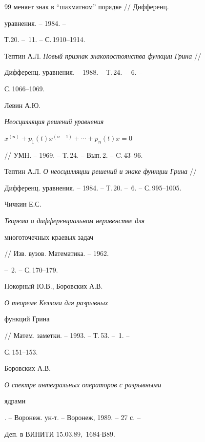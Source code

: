 \begin{thebibliography}{99}
{меняет знак в ``шахматном'' порядке} // Дифференц. 


уравнения. -- 1984. -- 


Т.20. -- \No\,11. -- С.\,1910--1914. 




Тептин А.Л. {\em Новый признак знакопостоянства функции Грина} // 


Дифференц. уравнения. -- 1988. -- Т.\,24. -- \No\,6. -- 


С.\,1066--1069. 




Левин А.Ю. {\em Неосцилляция решений уравнения 


$x^{(n)}+p_1(t)x^{(n-1)}+\dotsb+p_n(t)x=0$} 


// УМН. -- 1969. -- Т.\,24. -- Вып.\,2. -- C.\,43--96. 




Тептин А.Л. {\em О неосцилляции решений и знаке функции Грина} // 


Дифференц. уравнения. -- 1984. -- Т.\,20. -- \No\,6. -- С.\,995--1005. 




Чичкин Е.С. {\em Теорема о дифференциальном неравенстве для 


многоточечных краевых задач} // Изв. вузов. Математика. -- 1962. 


-- \No\,2. -- С.\,170--179. 




Покорный Ю.В., Боровских А.В. {\em О теореме Келлога для разрывных 


функций Грина} // Матем. заметки. -- 1993. -- Т.\,53. -- \No\,1. -- 


С.\,151--153. 




Боровских А.В. {\em О спектре интегральных операторов с разрывными 


ядрами}. -- Воронеж. ун-т. -- Воронеж, 1989. -- 27 с. -- 


Деп. в ВИНИТИ 15.03.89, \No\,1684-В89. 


 


\end{thebibliography} 


 


\vskip 0.5cm 


 






 


\label{end} 


 


 


